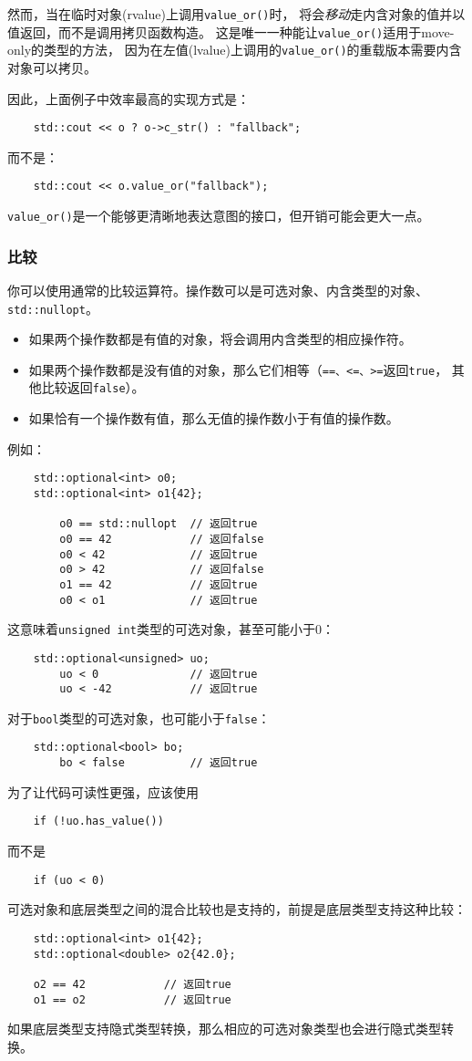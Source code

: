 然而，当在临时对象(rvalue)上调用\texttt{value\_or()}时，
将会\emph{移动}走内含对象的值并以值返回，而不是调用拷贝函数构造。
这是唯一一种能让\texttt{value\_or()}适用于move-only的类型的方法，
因为在左值(lvalue)上调用的\texttt{value\_or()}的重载版本需要内含对象可以拷贝。

因此，上面例子中效率最高的实现方式是：
\begin{lstlisting}
    std::cout << o ? o->c_str() : "fallback";
\end{lstlisting}
而不是：
\begin{lstlisting}
    std::cout << o.value_or("fallback");
\end{lstlisting}
\texttt{value\_or()}是一个能够更清晰地表达意图的接口，但开销可能会更大一点。

\subsubsection{比较}
你可以使用通常的比较运算符。操作数可以是可选对象、内含类型的对象、\texttt{std::nullopt}。
\begin{itemize}
    \item 如果两个操作数都是有值的对象，将会调用内含类型的相应操作符。
    \item 如果两个操作数都是没有值的对象，那么它们相等（\texttt{==、<=、>=}返回\texttt{true}，
    其他比较返回\texttt{false}）。
    \item 如果恰有一个操作数有值，那么无值的操作数小于有值的操作数。
\end{itemize}
例如：
\begin{lstlisting}
    std::optional<int> o0;
    std::optional<int> o1{42};

        o0 == std::nullopt  // 返回true
        o0 == 42            // 返回false
        o0 < 42             // 返回true
        o0 > 42             // 返回false
        o1 == 42            // 返回true
        o0 < o1             // 返回true
\end{lstlisting}
这意味着\texttt{unsigned int}类型的可选对象，甚至可能小于0：
\begin{lstlisting}
    std::optional<unsigned> uo;
        uo < 0              // 返回true
        uo < -42            // 返回true
\end{lstlisting}
对于\texttt{bool}类型的可选对象，也可能小于\texttt{false}：
\begin{lstlisting}
    std::optional<bool> bo;
        bo < false          // 返回true
\end{lstlisting}
为了让代码可读性更强，应该使用
\begin{lstlisting}
    if (!uo.has_value())
\end{lstlisting}
而不是
\begin{lstlisting}
    if (uo < 0)
\end{lstlisting}
可选对象和底层类型之间的混合比较也是支持的，前提是底层类型支持这种比较：
\begin{lstlisting}
    std::optional<int> o1{42};
    std::optional<double> o2{42.0};

    o2 == 42            // 返回true
    o1 == o2            // 返回true
\end{lstlisting}
如果底层类型支持隐式类型转换，那么相应的可选对象类型也会进行隐式类型转换。

